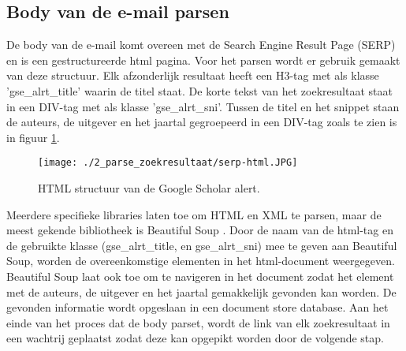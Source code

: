 \subsection{Body van de e-mail parsen}
De body van de e-mail komt overeen met de Search Engine Result Page (SERP) en is een gestructureerde html pagina. Voor het parsen wordt er gebruik gemaakt van deze structuur.
Elk afzonderlijk resultaat heeft een H3-tag met als klasse 'gse\_alrt\_title' waarin de titel staat. De korte tekst van het zoekresultaat staat in een DIV-tag met als klasse 'gse\_alrt\_sni'. Tussen de titel en het snippet staan de auteurs, de uitgever en het jaartal gegroepeerd in een DIV-tag zoals te zien is in figuur \ref{fig:serp-html}.
\begin{figure}
 \centering
 \texttt{[image: ./2\_parse\_zoekresultaat/serp-html.JPG]}
 \caption[HTML structuur van de Google Scholar alert.]{\label{fig:serp-html}HTML structuur van de Google Scholar alert.}
\end{figure}
\FloatBarrier
Meerdere specifieke libraries laten toe om HTML en XML te parsen, maar de meest gekende bibliotheek is Beautiful Soup \autocite{Soup2025}. Door de naam van de html-tag en de gebruikte klasse (gse\_alrt\_title, en gse\_alrt\_sni) mee te geven aan Beautiful Soup, worden de overeenkomstige elementen in het html-document weergegeven. Beautiful Soup laat ook toe om te navigeren in het document zodat het element met de auteurs, de uitgever en het jaartal gemakkelijk gevonden kan worden.
De gevonden informatie wordt opgeslaan in een document store database.
Aan het einde van het proces dat de body parset, wordt de link van elk zoekresultaat in een wachtrij geplaatst zodat deze kan opgepikt worden door de volgende stap.


